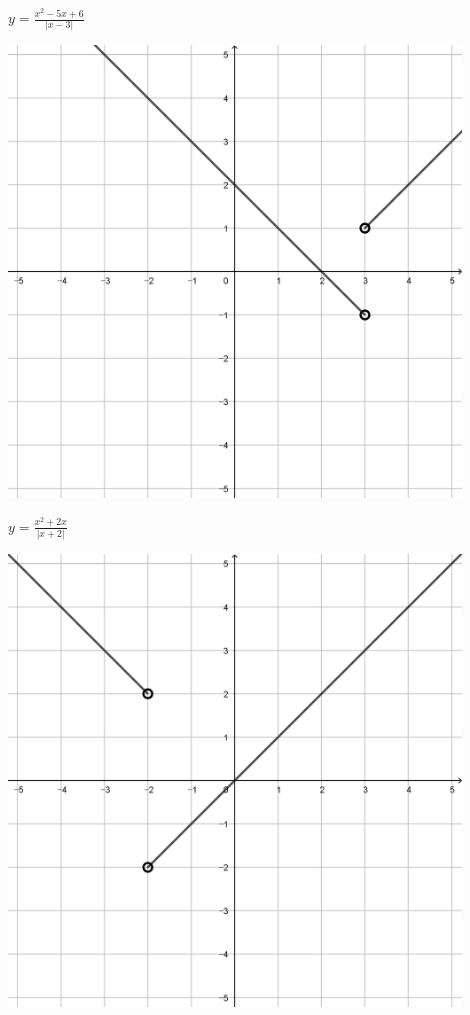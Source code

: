 \documentclass[a4paper]{oblivoir}
\begin{document}
\begin{minipage}{0.45\textwidth}\centering
\(y=\frac{x^2-5x+6}{|x-3|}\)
\par\bigskip\includegraphics[width=0.9\textwidth]{img/3_piecewise_29}
\end{minipage}
\begin{minipage}{0.45\textwidth}\centering
\(y=\frac{x^2+2x}{|x+2|}\)
\par\bigskip\includegraphics[width=0.9\textwidth]{img/3_piecewise_30}
\end{minipage}\bigskip\bigskip\par
\end{document}
